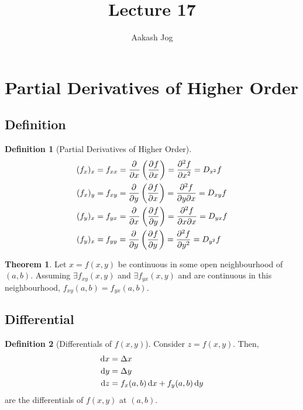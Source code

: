 \documentclass[fleqn, a4paper, 12pt]{article}
\title{Lecture 17}
\author{Aakash Jog}
\date{\formatdate{28}{12}{2014}}
\theoremstyle{definition}
\newtheorem{definition}{Definition}
\theoremstyle{theorem}
\newtheorem{theorem}{Theorem}
\theoremstyle{remark}
\begin{document}
	
\maketitle

\tableofcontents

\newpage

\section{Partial Derivatives of Higher Order}

\subsection{Definition}

\begin{definition}[Partial Derivatives of Higher Order]
	\begin{align*}
		(f_x)_x &= f_{xx} = \dpd{}{x} \left( \dpd{f}{x} \right) = \dpd[2]{f}{x} = D_{x^2} f\\
		(f_x)_y &= f_{xy} = \dpd{}{y} \left( \dpd{f}{x} \right) = \dfrac{\partial^2 f}{\partial y \partial x} = D_{xy} f\\
		(f_y)_x &= f_{yx} = \dpd{}{x} \left( \dpd{f}{y} \right) = \dfrac{\partial^2 f}{\partial x \partial x} = D_{yx} f\\
		(f_y)_x &= f_{yy} = \dpd{}{y} \left( \dpd{f}{y} \right) = \dpd[2]{f}{y} = D_{y^2} f
	\end{align*}
\end{definition}

\begin{theorem}
	Let $x = f(x, y)$ be continuous in some open neighbourhood of $(a, b)$. Assuming $\exists f_{xy}(x, y)$ and $\exists f_{yx}(x, y)$ and are continuous in this neighbourhood, $f_{xy}(a, b) = f_{yx}(a, b)$.
\end{theorem}

\subsection{Differential}

\begin{definition}[Differentials of $f(x, y)$]
	Consider $z = f(x, y)$. Then,
	\begin{align*}
		\dif x &= \Delta x\\
		\dif y &= \Delta y\\
		\dif z &= f_x(a, b) \dif x + f_y(a, b) \dif y
	\end{align*}
	 are the differentials of $f(x, y)$ at $(a, b)$.
\end{definition}
\end{document}
